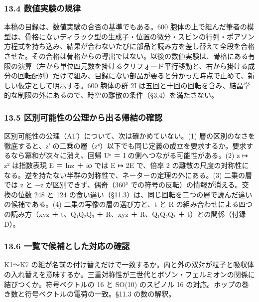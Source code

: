 \documentclass[
  a4paper,
]{ltjsarticle}
\begin{document}
\subsubsection{13.4
数値実験の規律}\label{ux6570ux5024ux5b9fux9a13ux306eux898fux5f8b}

本稿の目録は、数値実験の合否の基準でもある。600
胞体の上で組んだ筆者の模型は、骨格にないディラック型の生成子・位置の微分・スピンの行列・ポアソン方程式を持ち込み、結果が合わないたびに部品と読み方を差し替えて全段を合格させた。その合格は骨格からの導出ではない。以後の数値実験は、骨格にある有限の演算（左から単位四元数を掛けるクリフォード平行移動と、右から掛ける成分の回転配列）だけで組み、目録にない部品が要ると分かった時点で止めて、新しい仮定として明示する。600
胞体の群 2I
は五回と十回の回転を含み、結晶学的な制限の外にあるので、時空の離散の条件（§3.4）を満たさない。

\subsubsection{13.5
区別可能性の公理から出る帰結の確認}\label{ux533aux5225ux53efux80fdux6027ux306eux516cux7406ux304bux3089ux51faux308bux5e30ux7d50ux306eux78baux8a8d}

区別可能性の公理（A1′）について、次は確かめていない。(1)
層の区別のなさを徹底すると、z′
の二乗の層（z⁴）以下でも同じ定義の成立を要求するか。要求するなら冪和が次々に消え、回帰
Uⁿ ＝ I の側へつながる可能性がある。(2) z ↦ z² は指数表現 E ＝
ln\textbar z\textbar{} ＋ iφ では E ↦ 2E で、倍率 2
の離散の尺度の対称性になる。逆を持たない半群の対称性で、ネーターの定理の外にある。(3)
二乗の層では z と −z が区別できず、偶奇（360°
での符号の反転）の情報が消える。交換の位数 248 と 124
の食い違い（§11.3）は、同じ回転を二つの層で読んだ違いの候補である。(4)
二乗の写像の層の選び方と、t と R の組み合わせによる四つの読み方（xyz ＋
t、Q₁Q₂Q₃ ＋ R、xyz ＋ R、Q₁Q₂Q₃ ＋ t）との関係（付録 D）。

\subsubsection{13.6
一覧で候補とした対応の確認}\label{ux4e00ux89a7ux3067ux5019ux88dcux3068ux3057ux305fux5bfeux5fdcux306eux78baux8a8d}

K1〜K7
の組が名前の付け替えだけで一致するか。内と外の双対が粒子と吸収体の入れ替えを意味するか。三重対称性が三世代とボゾン・フェルミオンの関係に結びつくか。符号ベクトルの
16 と SO(10) のスピノル 16
の対応。ホップの巻き数と符号ベクトルの電荷の一致。§11.3 の数の解釈。
\end{document}
